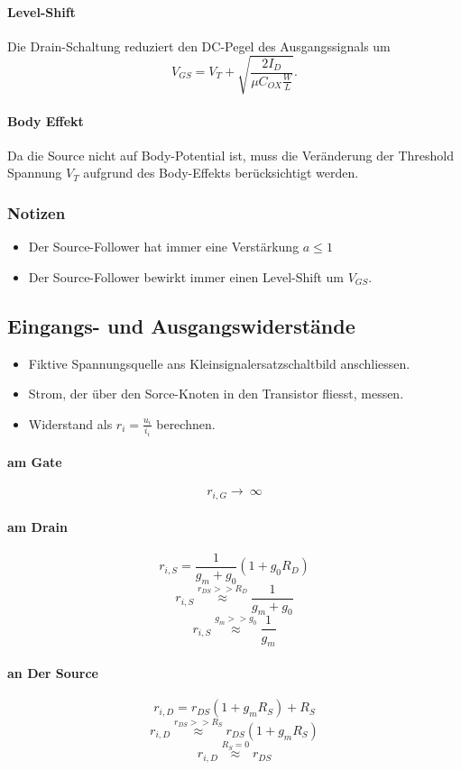 \paragraph{Level-Shift}
Die Drain-Schaltung reduziert den DC-Pegel des Ausgangssignals um 
\[
    V_{GS} = V_T + \sqrt{\frac{2 I_D}{\mu C_{OX} \frac{W}{L}}}.
\]

\paragraph{Body Effekt}
Da die Source nicht auf Body-Potential ist, muss die Veränderung der Threshold Spannung $V_T$ aufgrund des Body-Effekts berücksichtigt werden.

\subsubsection{Notizen}
\begin{itemize}
    \item Der Source-Follower hat immer eine Verstärkung $a \leq 1$
    \item Der Source-Follower bewirkt immer einen Level-Shift um $V_{GS}$.
\end{itemize}

\subsection{Eingangs- und Ausgangswiderstände}
\begin{itemize}
    \item Fiktive Spannungsquelle ans Kleinsignalersatzschaltbild anschliessen.
    \item Strom, der über den Sorce-Knoten in den Transistor fliesst, messen.
    \item Widerstand als $r_i = \frac{u_i}{i_i}$ berechnen.
\end{itemize}

\paragraph{am Gate}
\[
    r_{i, G} \to\ \infty
\]
\paragraph{am Drain}
\[
    r_{i, S} = \frac{1}{g_m + g_0} (1 + g_0 R_D)
\]
\[
    r_{i, S} \overset{r_{DS}>>R_D}{\approx} \frac{1}{g_m + g_0}
\]
\[
    r_{i, S} \overset{g_m>>g_0}{\approx} \frac{1}{g_m}
\]
\paragraph{an Der Source}
\[
    r_{i, D} = r_{DS} (1+g_m R_S) + R_S
\]
\[
    r_{i, D} \overset{r_{DS}>>R_S}{\approx} r_{DS} (1+g_m R_S)
\]
\[
    r_{i, D} \overset{R_S = 0}{\approx} r_{DS}
\]